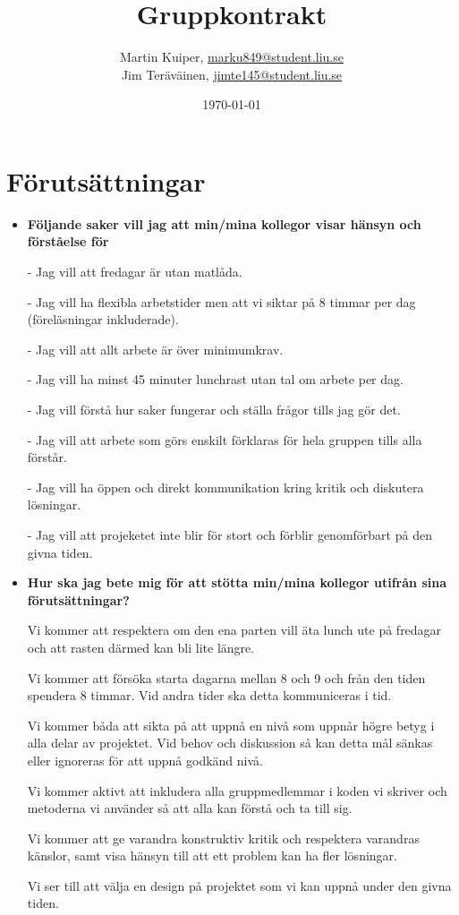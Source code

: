 \documentclass{mall}
\author{Martin Kuiper, \url{marku849@student.liu.se}\\
  Jim Teräväinen, \url{jimte145@student.liu.se}}
\title{Gruppkontrakt}
\date{\today}
\begin{document}
\projectpage

\section{Förutsättningar}
\label{prereq}

\begin{itemize}
\item \textbf{Följande saker vill jag att min/mina kollegor visar hänsyn och förståelse för}

  - Jag vill att fredagar är utan matlåda.

  - Jag vill ha flexibla arbetstider men att vi siktar på 8 timmar per dag (föreläsningar inkluderade).

  - Jag vill att allt arbete är över minimumkrav.

  - Jag vill ha minst 45 minuter lunchrast utan tal om arbete per dag.

  - Jag vill förstå hur saker fungerar och ställa frågor tills jag gör det.

  - Jag vill att arbete som görs enskilt förklaras för hela gruppen tills alla förstår.

  - Jag vill ha öppen och direkt kommunikation kring kritik och diskutera lösningar.

  - Jag vill att projeketet inte blir för stort och förblir genomförbart på den givna tiden.

\item \textbf{Hur ska jag bete mig för att stötta min/mina kollegor utifrån sina förutsättningar?}

  Vi kommer att respektera om den ena parten vill äta lunch ute på fredagar och att rasten därmed kan bli lite längre. 

Vi kommer att försöka starta dagarna mellan 8 och 9 och från den tiden spendera 8 timmar. Vid andra tider ska detta kommuniceras i tid.

Vi kommer båda att sikta på att uppnå en nivå som uppnår högre betyg i alla delar av projektet. Vid behov och diskussion så kan detta mål sänkas eller ignoreras för att uppnå godkänd nivå.

Vi kommer aktivt att inkludera alla gruppmedlemmar i koden vi skriver och metoderna vi använder så att alla kan förstå och ta till sig.

Vi kommer att ge varandra konstruktiv kritik och respektera varandras känslor, samt visa hänsyn till att ett problem kan ha fler lösningar.

Vi ser till att välja en design på projektet som vi kan uppnå under den givna tiden.

\end{itemize}
\end{document}

